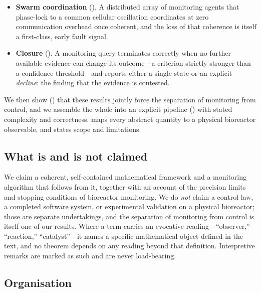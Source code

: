 \documentclass[11pt,twocolumn,a4paper]{article}
\theoremstyle{thmstyle}
\theoremstyle{definition}
\theoremstyle{remark}
\begin{document}
\begin{itemize}[leftmargin=1.6em,itemsep=3pt]
bulk-average methods provably cannot detect.
\item \textbf{Swarm coordination} (). A distributed array
of monitoring agents that phase-lock to a common cellular oscillation
coordinates at zero communication overhead once coherent, and the loss of
that coherence is itself a first-class, early fault signal.
\item \textbf{Closure} (). A monitoring query terminates
correctly when no further available evidence can change its outcome---a
criterion strictly stronger than a confidence threshold---and reports
either a single state or an explicit \emph{decline}: the finding that the
evidence is contested.
\end{itemize}

We then show () that these results jointly force the
separation of monitoring from control, and we assemble the whole into an
explicit pipeline () with stated complexity and
correctness.  maps every abstract quantity to a physical
bioreactor observable, and  states scope and
limitations.

\subsection{What is and is not claimed}

We claim a coherent, self-contained mathematical framework and a monitoring
algorithm that follows from it, together with an account of the precision
limits and stopping conditions of bioreactor monitoring. We do \emph{not}
claim a control law, a completed software system, or experimental
validation on a physical bioreactor; those are separate undertakings, and
the separation of monitoring from control is itself one of our results.
Where a term carries an evocative reading---``observer,'' ``reaction,''
``catalyst''---it names a specific mathematical object defined in the text,
and no theorem depends on any reading beyond that definition. Interpretive
remarks are marked as such and are never load-bearing.

\subsection{Organisation}
\end{document}
